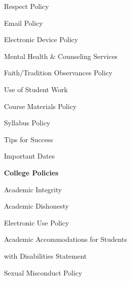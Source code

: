 \documentclass[11pt,letterpaper]{article}
\begin{document}
\begin{minipage}[t]{0.45\textwidth}
\hspace{0.3cm} Respect Policy \dotfill \pageref{respect} \par
\hspace{0.3cm} Email Policy \dotfill \pageref{email_policy} 
%
\end{minipage}\hfill\begin{minipage}[t]{0.45\textwidth} 
\hspace{0.3cm} Electronic Device Policy \dotfill \pageref{electronic} \par
\hspace{0.3cm} Mental Health \& Counseling Services \dotfill \pageref{mental_health} \par
\hspace{0.3cm} Faith/Tradition Observances Policy \dotfill \pageref{faith} \par
\hspace{0.3cm} Use of Student Work \dotfill \pageref{std_work} \par
\hspace{0.3cm} Course Materials Policy \dotfill \pageref{copyright} \par
\hspace{0.3cm} Syllabus Policy \dotfill \pageref{syllabus} \par
\hspace{0.3cm} Tips for Success \dotfill \pageref{tips} \par
\hspace{0.3cm} Important Dates \dotfill \pageref{imp_dates} \par
{\bfseries\color{stacred} College Policies} \dotfill \pageref{college_polc} \par
\hspace{0.3cm} Academic Integrity \dotfill \pageref{college_acadint} \par
\hspace{0.3cm} Academic Dishonesty \dotfill \pageref{college_acaddis} \par
\hspace{0.3cm} Electronic Use Policy \dotfill \pageref{college_elecuse} \par
\hspace{0.3cm} Academic Accommodations for Students \par
\hspace{0.6cm} with Disabilities Statement \dotfill \pageref{college_acadacc} \par
\hspace{0.3cm} Sexual Misconduct Policy \dotfill \pageref{college_sexmisconduct} \par

\end{minipage}
\end{document}
